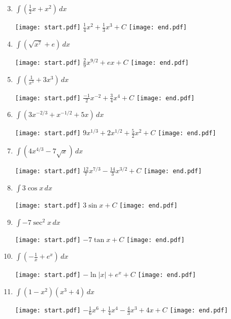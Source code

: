 \documentclass[12pt]{article}
\begin{document}
\begin{enumerate}
\setcounter{enumi}{2}

\item $\int \left(\frac{1}{2}x+x^2 \right)\,dx$ 

\texttt{[image: start.pdf]}
{{$\frac{1}{4}x^2+\frac{1}{3}x^3+C$}}
\texttt{[image: end.pdf]}


\item $\int \left(\sqrt{x^7}+e\right) \,dx$

\texttt{[image: start.pdf]}
{{$\frac{2}{9}x^{9/2}+ex+C$}}
\texttt{[image: end.pdf]}


\item $\int \left(\frac{1}{x^3}+3x^3\right) \,dx$ 

\texttt{[image: start.pdf]}
{{$\frac{-1}{2}x^{-2}+\frac{3}{4}x^4+C$}}
\texttt{[image: end.pdf]}


\item $\int \left(3x^{-2/3}+x^{-1/2} + 5x\right) \,dx$ 

\texttt{[image: start.pdf]}
{{$9x^{1/3}+2x^{1/2}+\frac{5}{2}x^2+C$}}
\texttt{[image: end.pdf]}


\item $\int \left(4x^{4/3}-7\sqrt{x}\right) \,dx$ 

\texttt{[image: start.pdf]}
{{$\frac{12}{7}x^{7/3}-\frac{14}{3}x^{3/2}+C$}}
\texttt{[image: end.pdf]}


\item $\int 3\cos{x} \,dx$ 

\texttt{[image: start.pdf]}
{{$3\sin{x}+C$}}
\texttt{[image: end.pdf]}


\item $\int -7\sec^{2}{x} \,dx$ 

\texttt{[image: start.pdf]}
{{$-7\tan{x}+C$}}
\texttt{[image: end.pdf]}


\item $\int \left(-\frac{1}{x}+ e^{x}\right) \,dx$ 

\texttt{[image: start.pdf]}
{{$-\ln{|x|}+e^{x}+C$}}
\texttt{[image: end.pdf]}


\item $\int (1-x^2)(x^3+4) \,dx$ 

\texttt{[image: start.pdf]}
{{$-\frac{1}{6}x^6+\frac{1}{4}x^4-\frac{4}{3}x^3+4x+C$}}
\texttt{[image: end.pdf]}



\end{enumerate}
\end{document}
